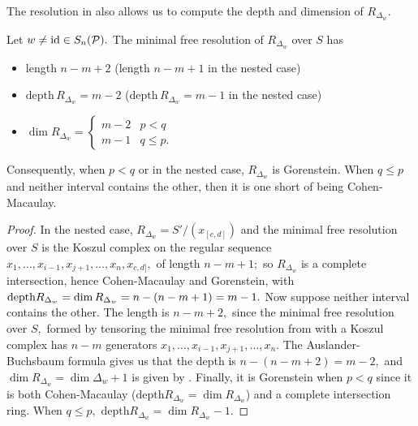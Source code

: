 The resolution in  also allows us to compute the depth and dimension of $R_{\Delta_w}.$
\begin{corollary}
\label{cor: len-depth-dim R_Delta}
    Let $w\neq\mathrm{id}\in S_n(\mathcal{P}).$ The minimal free resolution of $R_{\Delta_w}$ over $S$ has 
    \begin{itemize}
        \item length $n - m +2$ (length $n - m + 1$ in the nested case)
        \item $\mathrm{depth}\,R_{\Delta_w} = m - 2$  ($\mathrm{depth}\,R_{\Delta_w} = m - 1$ in the nested case) 
        \item $\dim R_{\Delta_w} = 
        \begin{cases}
        m - 2 & p < q \\
        m - 1 & q\leq p.
        \end{cases}
        $
    \end{itemize}
    Consequently, when $p < q$ or in the nested case, $R_{\Delta_w}$ is Gorenstein. When $q\leq p$ and neither interval contains the other, then it is one short of being Cohen-Macaulay. 
\end{corollary}
\begin{proof}
    In the nested case, $R_{\Delta_w} = S'/(x_{[c,d]})$ and the minimal free resolution over $S$ is the Koszul complex on the regular sequence $x_1,\ldots,x_{i-1},x_{j+1},\ldots,x_n,x_{c,d]},$ of length $n-m+1;$ so $R_{\Delta_w}$ is a complete intersection, hence Cohen-Macaulay and Gorenstein, with $\mathrm{depth} R_{\Delta_w} = \dim R_{\Delta_w} = n - (n - m + 1) = m - 1.$ 
    Now suppose neither interval contains the other.
    The length is $n - m +2,$ since the minimal free resolution over $S,$ formed by tensoring the minimal free resolution from  with a Koszul complex has $n-m$ generators $x_1,\ldots,x_{i-1},x_{j+1},\ldots,x_n.$ 
    The Auslander-Buchsbaum formula gives us that the depth is $n - (n - m + 2) = m - 2,$ and $\dim R_{\Delta_w} = \dim\Delta_w+1$ is given by . 
    Finally, it is Gorenstein when $p < q$ since it is both Cohen-Macaulay ($\mathrm{depth}R_{\Delta_w} = \dim R_{\Delta_w}$) and a complete intersection ring. 
    When $q\leq p,$ $\mathrm{depth}R_{\Delta_w} = \dim R_{\Delta_w}-1.$
\end{proof}


